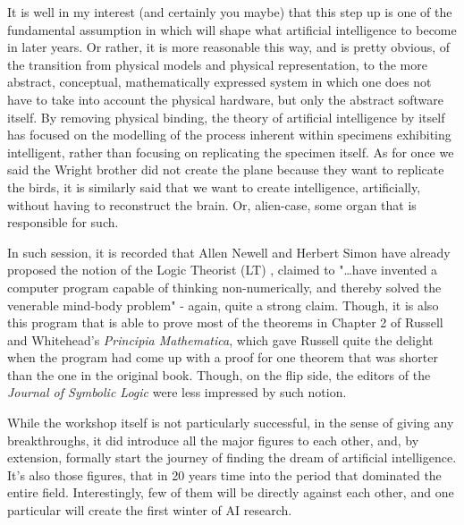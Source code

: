 It is well in my interest (and certainly you maybe) that this step up is one of the fundamental assumption in which will shape what artificial intelligence to become in later years. Or rather, it is more reasonable this way, and is pretty obvious, of the transition from physical models and physical representation, to the more abstract, conceptual, mathematically expressed system in which one does not have to take into account the physical hardware, but only the abstract software itself. By removing physical binding, the theory of artificial intelligence by itself has focused on the modelling of the process inherent within specimens exhibiting intelligent, rather than focusing on replicating the specimen itself. As for once we said the Wright brother did not create the plane because they want to replicate the birds, it is similarly said that we want to create intelligence, artificially, without having to reconstruct the brain. Or, alien-case, some organ that is responsible for such. 

In such session, it is recorded that Allen Newell and Herbert Simon have already proposed the notion of the Logic Theorist (LT) \cite{1056797NewellSimon}, claimed to "\dots have invented a computer program capable of thinking non-numerically, and thereby solved the venerable mind-body problem" - again, quite a strong claim. Though, it is also this program that is able to prove most of the theorems in Chapter 2 of Russell and Whitehead's \textit{Principia Mathematica}, which gave Russell quite the delight when the program had come up with a proof for one theorem that was shorter than the one in the original book. Though, on the flip side, the editors of the \textit{Journal of Symbolic Logic} were less impressed by such notion. 

While the workshop itself is not particularly successful, in the sense of giving any breakthroughs, it did introduce all the major figures to each other, and, by extension, formally start the journey of finding the dream of artificial intelligence. It's also those figures, that in 20 years time into the period that dominated the entire field. Interestingly, few of them will be directly against each other, and one particular will create the first winter of AI research. 

